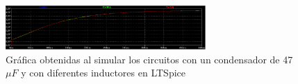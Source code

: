 \documentclass[journal]{IEEEtran}
\begin{document}
\begin{figure}
	\centering
	\includegraphics[width=3in]{img/simulacion10.png}
	\caption{Gráfica obtenidas al simular los circuitos con un condensador de 47 \(\mu F\) y  con diferentes inductores en LTSpice}
	\label{fig:sim10}
\end{figure}

%


%



%
\end{document}
